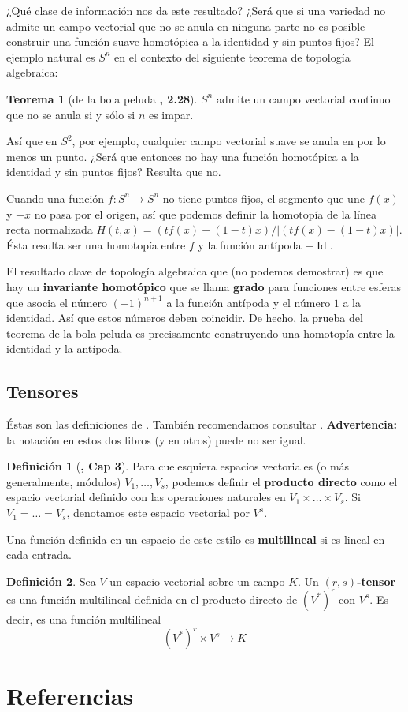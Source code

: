 \documentclass[spanish]{book}
\theoremstyle{definition}
\newtheorem*{defn}{Definición}
\newtheorem*{teo}{Teorema}
\DeclareMathOperator{\Id}{Id}
\begin{document}
¿Qué clase de información nos da este resultado? ¿Será que si una variedad no admite un campo vectorial que no se anula en ninguna parte no es posible construir una función suave homotópica a la identidad y sin puntos fijos? El ejemplo natural es $S^n$ en el contexto del siguiente teorema de topología algebraica:
\begin{teo}[de la bola peluda \cite{Hatcher}\textbf{, 2.28}]
	$S^n$ admite un campo vectorial continuo que no se anula si y sólo si $n$ es impar.
\end{teo}
Así que en $S^2$, por ejemplo, cualquier campo vectorial suave se anula en por lo menos un punto. ¿Será que entonces no hay una función homotópica a la identidad y sin puntos fijos? Resulta que no.

Cuando una función ${f:S^n\to S^n}$ no tiene puntos fijos, el segmento que une $f(x)$ y $-x$ no pasa por el origen, así que podemos definir la homotopía de la línea recta normalizada $H(t,x)=(tf(x)-(1-t)x)/|(tf(x)-(1-t)x)|$. Ésta resulta ser una homotopía entre $f$ y la función antípoda $-\Id$.

El resultado clave de topología algebraica que (no podemos demostrar) es que hay un \textbf{invariante homotópico }que se llama \textbf{grado} para funciones entre esferas que asocia el número $(-1)^{n+1}$ a la función antípoda y el número $1$ a la identidad. Así que estos números deben coincidir. De hecho, la prueba del teorema de la bola peluda es precisamente construyendo una homotopía entre la identidad y la antípoda.
\section{Tensores}
Éstas son las definiciones de \cite{ONeill}. También recomendamos consultar \cite{Palmas}. \textbf{Advertencia:} la notación en estos dos libros (y en otros) puede no ser igual.
\begin{defn}[\cite{ONeill}\textbf{, Cap 3}]
	Para cuelesquiera espacios vectoriales (o más generalmente, módulos) $V_1,\ldots,V_s$, podemos definir el \textbf{producto directo} como el espacio vectorial definido con las operaciones naturales en $V_1\times\ldots\times V_s$. Si $V_1=\ldots=V_s$, denotamos este espacio vectorial por $V^s$.
	
	Una función definida en un espacio de este estilo es \textbf{multilineal} si es lineal en cada entrada.
\end{defn}
\begin{defn}
	Sea $V$ un espacio vectorial sobre un campo $K$. Un \textbf{$(r,s)$-tensor} es una función multilineal definida en el producto directo de $(V^*)^r$ con $V^s$. Es decir, es una función multilineal
	\[(V^*)^r\times V^s\to K\]
\end{defn}

\chapter{Referencias}
\printbibliography[heading=none]
\end{document}
